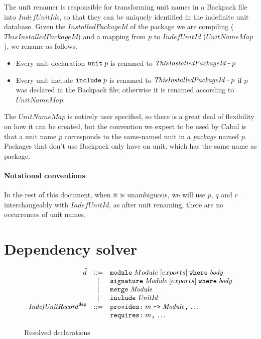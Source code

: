 \documentclass{article}
\newcommand{\I}[1]{\ensuremath{\mathit{#1}}}
\begin{document}
The unit renamer is responsible for transforming unit names in a
Backpack file into \I{IndefUnitId}s, so that they can be uniquely
identified in the indefinite unit database.
Given the \I{InstalledPackageId} of the package we are compiling (\I{ThisInstalledPackageId})
and a mapping from $p$ to \I{IndefUnitId} (\I{UnitNameMap}), we rename
as follows:

\begin{itemize}
    \item Every unit declaration $\verb|unit|\; p$ is renamed to $\I{ThisInstalledPackageId}\, \verb|-|\, p$
    \item Every unit include $\verb|include|\; p$ is renamed to $\I{ThisInstalledPackageId}\, \verb|-|\, p$ if $p$ was declared in the Backpack file; otherwise it is renamed according to \I{UnitNameMap}.
\end{itemize}

The \I{UnitNameMap} is entirely user specified, so there is a great deal
of flexibility on how it can be created, but the convention we expect to
be used by Cabal is that a unit name $p$ corresponds to the same-named
unit in a \emph{package} named $p$.  Packages that don't use Backpack
only have on unit, which has the same name as package.

\paragraph{Notational conventions}
In the rest of this document, when it is unambiguous, we will use $p$, $q$ and $r$
interchangeably with \I{IndefUnitId}, as after unit renaming, there
are no occurrences of unit names.

\newpage
\section{Dependency solver}

\begin{figure}[htpb]
$$
\begin{array}{rcll}
  \tilde{d} & ::= & \verb|module|\;    Module \; [exports]\; \verb|where|\; \I{body} \\
    & |   & \verb|signature|\; \I{Module} \; [exports]\; \verb|where|\; \I{body} \\
    & |   & \verb|merge|\; \I{Module} \\
    & |   & \verb|include|\; \I{UnitId} \\
  \I{IndefUnitRecord}^{\mathsf{dep}} & ::= & \verb|provides:|\; m\; \verb|->|\; \I{Module}\verb|,|\, \ldots\\
    & & \verb|requires:|\; m\verb|,|\, \ldots
\end{array}
$$
\caption{Resolved declarations} \label{fig:resolved}
\end{figure}
\end{document}
